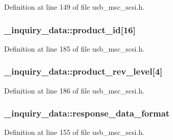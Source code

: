 Definition at line 149 of file usb\+\_\+msc\+\_\+scsi.\+h.

\subsubsection[{\texorpdfstring{product\+\_\+id}{product_id}}]{ \+\_\+inquiry\+\_\+data\+::product\+\_\+id\mbox{[}16\mbox{]}}\hypertarget{struct__inquiry__data_a6adc548fd164d8d74c79647abfe3fb26}{}\label{struct__inquiry__data_a6adc548fd164d8d74c79647abfe3fb26}


Definition at line 185 of file usb\+\_\+msc\+\_\+scsi.\+h.

\subsubsection[{\texorpdfstring{product\+\_\+rev\+\_\+level}{product_rev_level}}]{ \+\_\+inquiry\+\_\+data\+::product\+\_\+rev\+\_\+level\mbox{[}4\mbox{]}}\hypertarget{struct__inquiry__data_a51485235c6aaa42d814de55fb99b4596}{}\label{struct__inquiry__data_a51485235c6aaa42d814de55fb99b4596}


Definition at line 186 of file usb\+\_\+msc\+\_\+scsi.\+h.

\subsubsection[{\texorpdfstring{response\+\_\+data\+\_\+format}{response_data_format}}]{ \+\_\+inquiry\+\_\+data\+::response\+\_\+data\+\_\+format}\hypertarget{struct__inquiry__data_a90d3c3f937adb2967325c943b2b1eaa7}{}\label{struct__inquiry__data_a90d3c3f937adb2967325c943b2b1eaa7}


Definition at line 155 of file usb\+\_\+msc\+\_\+scsi.\+h.

